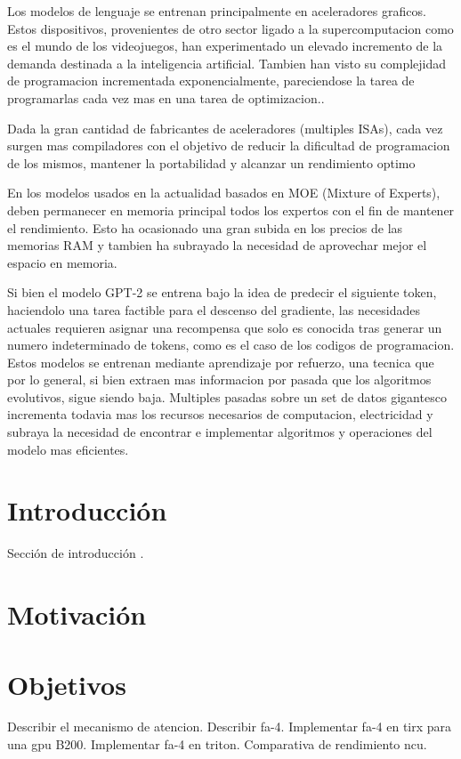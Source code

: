 \begin{list}
\item{Los modelos de lenguaje se entrenan principalmente en aceleradores graficos. Estos dispositivos, provenientes de otro sector ligado a la supercomputacion como es el mundo de los videojuegos, han experimentado un elevado incremento de la demanda destinada a la inteligencia artificial. Tambien han visto su complejidad de programacion incrementada exponencialmente, pareciendose la tarea de programarlas cada vez mas en una tarea de optimizacion.}.
\item{Dada la gran cantidad de fabricantes de aceleradores (multiples ISAs), cada vez surgen mas compiladores con el objetivo de reducir la dificultad de programacion de los mismos, mantener la portabilidad y alcanzar un rendimiento optimo}
\item{En los modelos usados en la actualidad basados en MOE (Mixture of Experts), deben permanecer en memoria principal todos los expertos con el fin de mantener el rendimiento. Esto ha ocasionado una gran subida en los precios de las memorias RAM y tambien ha subrayado la necesidad de aprovechar mejor el espacio en memoria.}
\item{Si bien el modelo GPT-2 se entrena bajo la idea de predecir el siguiente token, haciendolo una tarea factible para el descenso del gradiente, las necesidades actuales requieren asignar una recompensa que solo es conocida tras generar un numero indeterminado de tokens, como es el caso de los codigos de programacion. Estos modelos se entrenan mediante aprendizaje por refuerzo, una tecnica que por lo general, si bien extraen mas informacion por pasada que los algoritmos evolutivos, sigue siendo baja. Multiples pasadas sobre un set de datos gigantesco incrementa todavia mas los recursos necesarios de computacion, electricidad y subraya la necesidad de encontrar e implementar algoritmos y operaciones del modelo mas eficientes.}


\section{Introducción}
Sección de introducción \cite{forecast}.
\section{Motivación}

\section{Objetivos}
Describir el mecanismo de atencion.
Describir fa-4.
Implementar fa-4 en tirx para una gpu B200.
Implementar fa-4 en triton.
Comparativa de rendimiento ncu.


\end{list}
